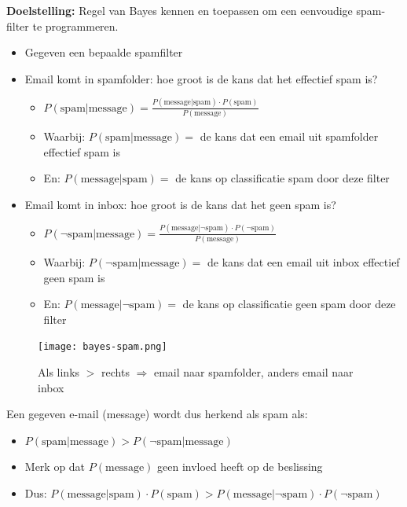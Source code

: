 \documentclass{article}
\begin{document}
\textbf{Doelstelling:} Regel van Bayes kennen en toepassen om een eenvoudige spam-filter te programmeren.

\begin{itemize}
    \item Gegeven een bepaalde spamfilter
    \item Email komt in spamfolder: hoe groot is de kans dat het effectief spam is?
    \begin{itemize}
        \item $P(\text{spam} | \text{message}) = \frac{P(\text{message}|\text{spam}) \cdot P(\text{spam})}{P(\text{message})}$
        \item Waarbij: $P(\text{spam} | \text{message})=$ de kans dat een email uit spamfolder effectief spam is
        \item En: $P(\text{message}|\text{spam})=$ de kans op classificatie spam door deze filter
    \end{itemize}
    \item Email komt in inbox: hoe groot is de kans dat het geen spam is?
    \begin{itemize}
        \item $P(\neg \text{spam} | \text{message}) = \frac{P(\text{message}|\neg \text{spam}) \cdot P(\neg \text{spam})}{P(\text{message})}$
        \item Waarbij: $P(\neg \text{spam} | \text{message})=$ de kans dat een email uit inbox effectief geen spam is
        \item En: $P(\text{message}| \neg \text{spam})=$ de kans op classificatie geen spam door deze filter
    \end{itemize}
\end{itemize}

\begin{figure}[H]
    \centering
    \texttt{[image: bayes-spam.png]}
    \caption{Als links $>$ rechts $\Rightarrow$ email naar spamfolder, anders email naar inbox}
\end{figure}

Een gegeven e-mail (message) wordt dus herkend als spam als:

\begin{itemize}
    \item $P(\text{spam} | \text{message}) > P(\neg \text{spam} | \text{message})$
    \item Merk op dat $P(\text{message})$ geen invloed heeft op de beslissing
    \item Dus: $P(\text{message}|\text{spam}) \cdot P(\text{spam}) > P(\text{message}|\neg \text{spam}) \cdot P(\neg \text{spam})$
\end{itemize}
\end{document}
